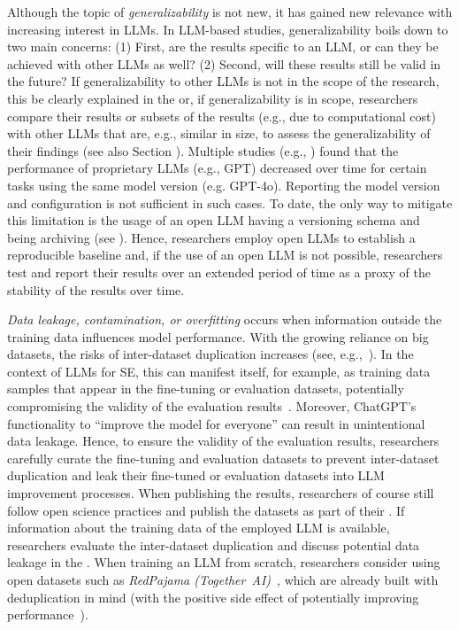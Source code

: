 Although the topic of \emph{generalizability} is not new, it has gained new relevance with increasing interest in LLMs.
In LLM-based studies, generalizability boils down to two main concerns:
(1) First, are the results specific to an LLM, or can they be achieved with other LLMs as well? 
(2) Second, will these results still be valid in the future?
If generalizability to other LLMs is not in the scope of the research, this \must be clearly explained in the \paper or, if generalizability is in scope, researchers \must compare their results or subsets of the results (e.g., due to computational cost) with other LLMs that are, e.g., similar in size, to assess the generalizability of their findings (see also Section \openllm).
Multiple studies (e.g., \cite{DBLP:journals/corr/abs-2307-09009, doi:10.1148/radiol.232411}) found that the performance of proprietary LLMs (e.g., GPT) decreased over time for certain tasks using the same model version (e.g. GPT-4o).
Reporting the model version and configuration is not sufficient in such cases.
To date, the only way to mitigate this limitation is the usage of an open LLM having a versioning schema and being archiving (see \openllm).
Hence, researchers \should employ open LLMs to establish a reproducible baseline and, if the use of an open LLM is not possible, researchers \should test and report their results over an extended period of time as a proxy of the stability of the results over time.

\emph{Data leakage, contamination, or overfitting} occurs when information outside the training data influences model performance. %
With the growing reliance on big datasets, the risks of inter-dataset duplication increases (see, e.g.,~\cite{DBLP:journals/pacmpl/LopesMMSYZSV17, DBLP:conf/oopsla/Allamanis19}). 
In the context of LLMs for SE, this can manifest itself, for example, as training data samples that appear in the fine-tuning or evaluation datasets, potentially compromising the validity of the evaluation results~\cite{DBLP:journals/tse/LopezCSSV25}.
Moreover, ChatGPT's functionality to ``improve the model for everyone'' can result in unintentional data leakage.
Hence, to ensure the validity of the evaluation results, researchers \should carefully curate the fine-tuning and evaluation datasets to prevent inter-dataset duplication and \mustnot leak their fine-tuned or evaluation datasets into LLM improvement processes.
When publishing the results, researchers \should of course still follow open science practices and publish the datasets as part of their \supplementarymaterial.
If information about the training data of the employed LLM is available, researchers \should evaluate the inter-dataset duplication and \must discuss potential data leakage in the \paper.
When training an LLM from scratch, researchers \may consider using open datasets such as \emph{RedPajama (Together~AI)}~\cite{together2023redpajama}, which are already built with deduplication in mind (with the positive side effect of potentially improving performance~\cite{DBLP:conf/acl/LeeINZECC22}).

